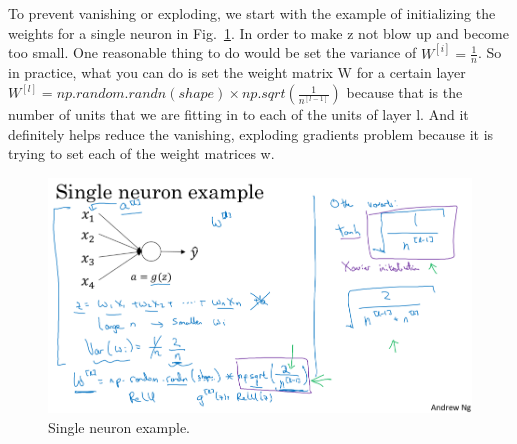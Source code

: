 \documentclass[a4paper]{article}
\begin{document}
To prevent vanishing or exploding, we start with the example of initializing the weights for a single neuron in Fig.~\ref{p13}. In order to make z not blow up and become too small. One reasonable thing to do would be set the variance of $W^{[i]}=\frac{1}{n}$. So in practice, what you can do is set the weight matrix W for a certain layer $W^{[l]}=np.random.randn(shape)\times np.sqrt(\frac{1}{n^{[l-1]}})$ because that is the number of units that we are fitting in to each of the units of layer l. And it definitely helps reduce the vanishing, exploding gradients problem because it is trying to set each of the weight matrices w.
\begin{figure}
	\begin{center}
		\includegraphics[scale=0.3]{figures/14.png}
	\end{center}
	\caption{Single neuron example.}
	\label{p13}
\end{figure}
\end{document}
